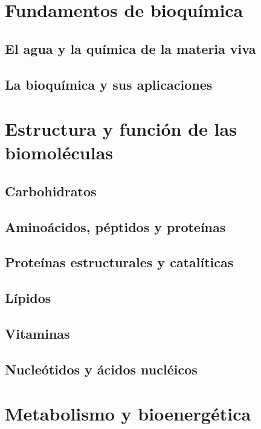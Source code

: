 \documentclass{../Resume}
\begin{document}
\Portada
\Indice
\fancystyle
\onehalfspacing


\part{Fundamentos de bioquímica}

    \chapter{El agua y la química de la materia viva}
    \chapter{La bioquímica y sus aplicaciones}

\part{Estructura y función de las biomoléculas}

    \chapter{Carbohidratos}
    \chapter{Aminoácidos, péptidos y proteínas}
        
        
    \chapter{Proteínas estructurales y catalíticas}
    \chapter{Lípidos}
        
    
    \chapter{Vitaminas}
    \chapter{Nucleótidos y ácidos nucléicos}

\part{Metabolismo y bioenergética}
\end{document}
